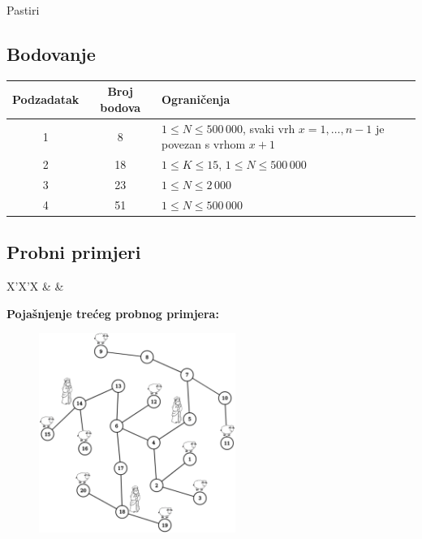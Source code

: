 \begin{statement}[
  problempoints=100,
  timelimit=1 sekunda,
  memorylimit=512 MiB,
]{Pastiri}
\subsection*{Bodovanje}
{\renewcommand{\arraystretch}{1.4}
  \setlength{\tabcolsep}{6pt}
  \begin{tabular}{ccl}
 Podzadatak & Broj bodova & Ograničenja \\ \midrule
  1 & 8 & $1 \le N \le 500\,000$, svaki vrh $x = 1, \dots, n-1$ je povezan s vrhom $x + 1$\\
  2 & 18 & $1 \le K \le 15 $, $1 \le N \le 500\,000$ \\
  3 & 23 & $1 \le N \le 2\,000$ \\
  4 & 51 & $1 \le N \le 500\,000$ \\
\end{tabular}}

\subsection*{Probni primjeri}
\begin{tabularx}{\textwidth}{X'X'X}
 &
 &
\end{tabularx}

\textbf{Pojašnjenje trećeg probnog primjera:}
\begin{figure}[H]
\centering
\includegraphics[width=0.57\textwidth]{img/pastiri_tp.png}
\end{figure}

\end{statement}

